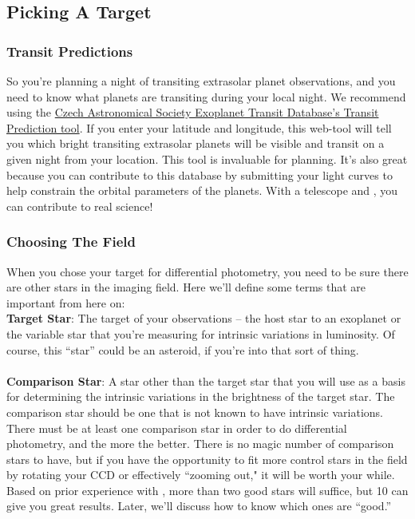 \documentclass{article}
\begin{document}
\subsection{Picking A Target}
\subsubsection{Transit Predictions}
So you're planning a night of transiting extrasolar planet observations, and you need to know what planets are transiting during your local night. We recommend using the \href{http://var2.astro.cz/ETD/predictions.php}{Czech Astronomical Society Exoplanet Transit Database's Transit Prediction tool}. If you enter your latitude and longitude, this web-tool will tell you which bright transiting extrasolar planets will be visible and transit on a given night from your location. This tool is invaluable for planning. It's also great because you can contribute to this database by submitting your light curves to help constrain the orbital parameters of the planets. With a telescope and \oscaar, you can contribute to real science!

\subsubsection{Choosing The Field}
When you chose your target for differential photometry, you need to be sure there are other stars in the imaging field. Here we'll define some terms that are important from here on:  \\ 

\noindent \textbf{Target Star}: The target of your observations -- the host star to an exoplanet or the variable star that you're measuring for intrinsic variations in luminosity. Of course, this ``star'' could be an asteroid, if you're into that sort of thing. \\\\
\textbf{Comparison Star}: A star other than the target star that you will use as a basis for determining the intrinsic variations in the brightness of the target star. The comparison star should be one that is not known to have intrinsic variations. \\

There must be at least one comparison star in order to do differential photometry, and the more the better. There is no magic number of comparison stars to have, but if you have the opportunity to fit more control stars in the field by rotating your CCD or effectively ``zooming out," it will be worth your while. Based on prior experience with \oscaar, more than two good stars will suffice, but 10 can give you great results. Later, we'll discuss how to know which ones are ``good.''
\end{document}
